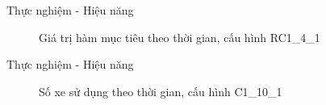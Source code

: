\begin{frame}{Thực nghiệm - Hiệu năng}
  \begin{figure}
    \centering
    \quad
  \caption{Giá trị hàm mục tiêu theo thời gian, cấu hình RC1\_4\_1}
  \end{figure}
\end{frame}

\begin{frame}{Thực nghiệm - Hiệu năng}
  \begin{figure}
    \centering
    \quad
  \caption{Số xe sử dụng theo thời gian, cấu hình C1\_10\_1}
  \end{figure}
\end{frame}

